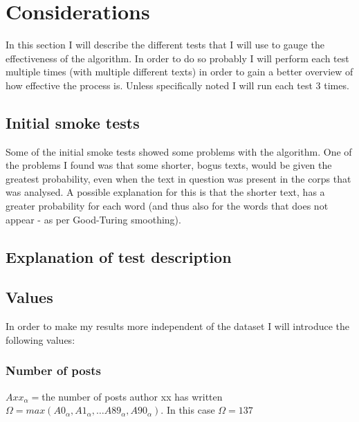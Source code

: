 \section{Considerations}
\label{considerations}

In this section I will describe the different tests that I will use to gauge the effectiveness of the algorithm. In order to do so probably I will perform each test multiple times (with multiple different texts) in order to gain a better overview of how effective the process is. Unless specifically noted I will run each test 3 times. 

\subsection{Initial smoke tests}
\label{smokeTest}
Some of the initial smoke tests showed some problems with the algorithm. 
One of the problems I found was that some shorter, bogus texts, would be given the greatest probability, even when the text in question was present in the corps that was analysed. A possible explanation for this is that the shorter text, has a greater probability for each word (and thus also for the  words that does not appear - as per Good-Turing smoothing).

\subsection{Explanation of test description}

\subsection{Values}
In order to make my results more independent of the dataset I will introduce the following values:

\subsubsection*{Number of posts}
$Axx_{\alpha} = $the number of posts author xx has written\\ 
$\Omega = max(A0_\alpha, A1_\alpha, \ldots A89_\alpha, A90_\alpha)$. In this case $\Omega = 137$\\

